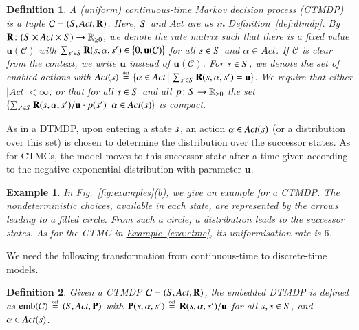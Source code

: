 \documentclass[10pt,twocolumn]{article}
\newtheorem{definition}{Definition}
\newtheorem{example}{Example}
\newcommand{\states} {{\ensuremath S}}
\newcommand{\state}  {{\ensuremath s}}
\newcommand{\reals}  {{\ensuremath {\mathbb{R}}}}
\newcommand{\acts}{\mathit{Act}}
\newcommand{\pmat}{\mathbf{P}}
\newcommand{\rmat}{\mathbf{R}}
\newcommand{\cmodel}{\mathcal{C}}
\newcommand{\urate}{\mathbf{u}}
\newcommand{\act}{\alpha}
\newcommand{\emb}{\mathrm{emb}}
\newcommand{\refdef}[1]{\texorpdfstring{\hyperref[def:#1]{Definition~\ref*{def:#1}}}{Definition \ref*{def:#1}}}
\newcommand{\reffig}[1]{\texorpdfstring{\hyperref[fig:#1]{Fig.~\ref*{fig:#1}}}{Fig.~\ref*{fig:#1}}}
\newcommand{\refexa}[1]{\texorpdfstring{\hyperref[exa:#1]{Example~\ref*{exa:#1}}}{Example~\ref*{exa:#1}}}
\newcommand{\defeq}{\,\stackrel{\mbox{\rm {\tiny def}}}{=}\,}
\begin{document}
\begin{definition}
  \label{def:ctmdp}
A \emph{(uniform) continuous-time Markov decision process (CTMDP)} is a tuple $\cmodel = (\states, \acts, \rmat)$.
  Here, $\states$ and $\acts$ are as in \refdef{dtmdp}.
  By $\rmat\colon (\states \times \acts \times \states) \to \reals_{\geq 0}$, we denote
  the \emph{rate matrix} such that there is a fixed value $\urate(\cmodel)$ with
  $\sum_{\state' \in \states} \rmat(\state,\act,\state') \in \bigl\{0, \urate(\cmodel)\bigr\}$ for all $\state \in \states$ and $\act \in \acts$.
  If $\cmodel$ is clear from the context, we write $\urate$ instead of $\urate(\cmodel)$.
  For $\state \in \states$, we denote the set of \emph{enabled} actions with $\acts(\state) \defeq \bigl\{ \act \in \acts \,\big|\,\sum_{\state' \in \states} \rmat(\state,\act,\state') = \urate \bigr\}$.
  We require that either $|\acts|<\infty$, or that for all $\state \in \states$ and all $p\colon \states \to \reals_{\geq 0}$ the set $\bigl\{\sum_{\state' \in \states} \rmat(\state, \act, \state')/\urate \cdot p(\state') \,\big|\,\act \in \acts(\state) \bigr\}$ is compact.
\end{definition}
As in a DTMDP, upon entering a state $\state$, an action $\act \in \acts(\state)$ (or a distribution over this set) is chosen to determine the distribution over the successor states.
As for CTMCs, the model moves to this successor state after a time given according to the negative exponential distribution with parameter $\urate$.

\begin{example}
  \label{exa:ctmdp}
In \reffig{examples}(b), we give an example for a CTMDP.
  The nondeterministic choices, available in each state, are represented 
  by the arrows leading to a filled circle. From such a circle, a 
  distribution leads to the successor states. As for the CTMC in \refexa{ctmc}, 
  its uniformisation rate is $6$.
\end{example}

We need the following transformation from continuous-time to discrete-time models.
\begin{definition}
  \label{def:emb}
Given a CTMDP $\cmodel = (\states, \acts, \rmat)$, the \emph{embedded DTMDP} is defined as
  $\emb(\cmodel) \defeq (\states, \acts, \pmat)$ with $\pmat(\state, \act, \state') \defeq \rmat(\state, \act, \state')/\urate$
  for all $\state, \state \in \states$, and $\act \in \acts(\state)$.
\end{definition}
\end{document}
